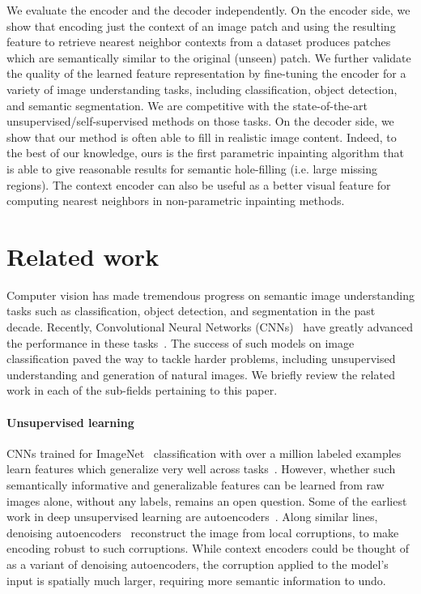 \documentclass[10pt,twocolumn,letterpaper]{article}
\begin{document}
We evaluate the encoder and the decoder independently.
On the encoder side, we show that encoding just the context of an image patch and using the resulting feature to retrieve nearest neighbor contexts from a dataset produces patches which are semantically similar to the original (unseen) patch.
%
%
We further validate the quality of the learned feature representation by fine-tuning the encoder for a variety of image understanding tasks, including classification, object detection, and semantic segmentation. We are competitive
%
with the state-of-the-art unsupervised/self-supervised methods on those tasks.
On the decoder side, we show that our method is often able to fill in realistic image content.
%
%
%
Indeed, to the best of our knowledge, ours is the first parametric inpainting algorithm that is able to give reasonable results for semantic hole-filling (i.e. large missing regions).  The context encoder can also be useful as a better visual feature for computing nearest neighbors in non-parametric inpainting methods.
%

\section{Related work}
Computer vision has made tremendous progress on semantic image understanding tasks such as classification, object detection, and segmentation in the past decade.
Recently, Convolutional Neural Networks (CNNs)~\cite{fukushima1980neocognitron,lecun1989backpropagation} have greatly advanced the performance in these tasks~\cite{krizhevsky2012imagenet,rcnn,long2014fully}.
%
%
The success of such models on image classification paved the way to tackle harder problems, including unsupervised understanding and generation of natural images.
We briefly review the related work in each of the sub-fields pertaining to this paper.

\paragraph{Unsupervised learning}
CNNs trained for ImageNet~\cite{imagenet} classification with over a million labeled examples learn features which generalize very well across tasks~\cite{donahue2013decaf}.
However, whether such semantically informative and generalizable features can be learned from raw images alone, without any labels, remains an open question.
Some of the earliest work in deep unsupervised learning are autoencoders~\cite{hintonautoenc,bengio2009learning}.
%
Along similar lines, denoising autoencoders~\cite{denoising} reconstruct the image from local corruptions, to make encoding robust to such corruptions.
While context encoders could be thought of as a variant of denoising autoencoders, the corruption applied to the model's input is spatially much larger, requiring more semantic information to undo.
\end{document}

